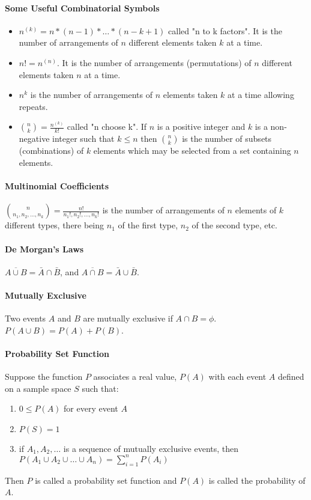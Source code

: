 \documentclass[10pt,letter]{article}
\begin{document}
\paragraph{Some Useful Combinatorial Symbols}
\begin{itemize}
    \item $n^{(k)} = n*(n-1)*\ldots * (n-k+1)$ called "n to k factors". It is the number of arrangements of $n$ different elements taken $k$ at a time. 
    \item $n!=n^{(n)}$. It is the number of arrangements (permutations) of $n$ different elements taken $n$ at a time.
    \item $n^k$ is the number of arrangements of $n$ elements taken $k$ at a time allowing repeats.
    \item ${n\choose k} = \frac{n^{(k)}}{k!}$ called "n choose k". If $n$ is a positive integer and $k$ is a non-negative integer such that $k\leq n$ then ${n\choose k}$ is the number of subsets (combinations) of $k$ elements which may be selected from a set containing $n$ elements. 
\end{itemize}

\paragraph{Multinomial Coefficients}
${n\choose n_1,n_2,\ldots,n_k}=\frac{n!}{n_1!,n_2!,\ldots,n_k!}$ is the number of arrangements of $n$ elements of $k$ different types, there being $n_1$ of the first type, $n_2$ of the second type, etc.

\paragraph{De Morgan's Laws}
$\overline{A\cup B}=\bar A \cap \bar B$, and $\overline{A\cap B}=\bar A\cup \bar B$.

\paragraph{Mutually Exclusive}
Two events $A$ and $B$ are mutually exclusive if $A\cap B=\phi$. $P(A\cup B) = P(A) + P(B)$. 

\paragraph{Probability Set Function}
Suppose the function $P$ associates a real value, $P(A)$ with each event $A$ defined on a sample space $S$ such that: \begin{enumerate}
    \item $0\leq P(A)$ for every event $A$
    \item $P(S)=1$
    \item if $A_1,A_2,\ldots$ is a sequence of mutually exclusive events, then $P(A_1\cup A_2\cup \ldots \cup A_n)=\sum_{i=1}^n P(A_i)$
\end{enumerate}
Then $P$ is called a probability set function and $P(A)$ is called the probability of $A$.
\end{document}
